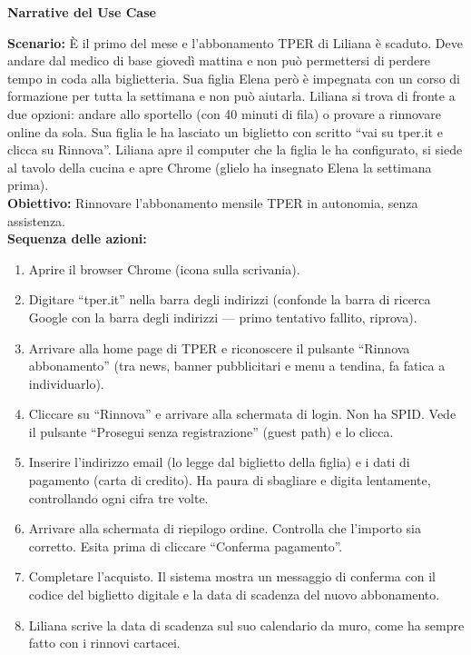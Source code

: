 \documentclass[11pt,a4paper]{article}
\begin{document}
\begin{tcolorbox}[colback=backgroundColor,colframe=borderColor,arc=2mm]
    \textbf{Narrative del Use Case} \\[4pt]
    {\small
    \textbf{Scenario:} È il primo del mese e l'abbonamento TPER di Liliana è scaduto. Deve andare dal medico di base giovedì mattina e non può permettersi di perdere tempo in coda alla biglietteria. Sua figlia Elena però è impegnata con un corso di formazione per tutta la settimana e non può aiutarla. Liliana si trova di fronte a due opzioni: andare allo sportello (con 40 minuti di fila) o provare a rinnovare online da sola. Sua figlia le ha lasciato un biglietto con scritto ``vai su tper.it e clicca su Rinnova''. Liliana apre il computer che la figlia le ha configurato, si siede al tavolo della cucina e apre Chrome (glielo ha insegnato Elena la settimana prima). \\[4pt]

    \textbf{Obiettivo:} Rinnovare l'abbonamento mensile TPER in autonomia, senza assistenza. \\[4pt]

    \textbf{Sequenza delle azioni:}
    \begin{enumerate}
        \item Aprire il browser Chrome (icona sulla scrivania).
        \item Digitare ``tper.it'' nella barra degli indirizzi (confonde la barra di ricerca Google con la barra degli indirizzi --- primo tentativo fallito, riprova).
        \item Arrivare alla home page di TPER e riconoscere il pulsante ``Rinnova abbonamento'' (tra news, banner pubblicitari e menu a tendina, fa fatica a individuarlo).
        \item Cliccare su ``Rinnova'' e arrivare alla schermata di login. Non ha SPID. Vede il pulsante ``Prosegui senza registrazione'' (guest path) e lo clicca.
        \item Inserire l'indirizzo email (lo legge dal biglietto della figlia) e i dati di pagamento (carta di credito). Ha paura di sbagliare e digita lentamente, controllando ogni cifra tre volte.
        \item Arrivare alla schermata di riepilogo ordine. Controlla che l'importo sia corretto. Esita prima di cliccare ``Conferma pagamento''.
        \item Completare l'acquisto. Il sistema mostra un messaggio di conferma con il codice del biglietto digitale e la data di scadenza del nuovo abbonamento.
        \item Liliana scrive la data di scadenza sul suo calendario da muro, come ha sempre fatto con i rinnovi cartacei.
    \end{enumerate}

}
\end{tcolorbox}
\end{document}
